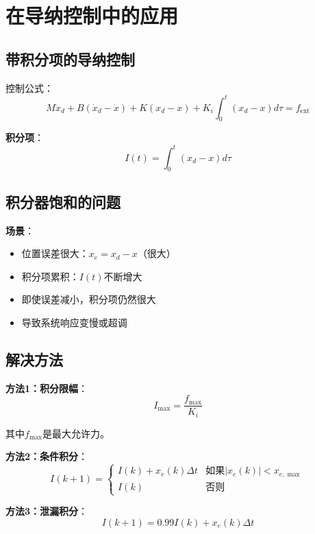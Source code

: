 \documentclass[12pt,a4paper]{article}
\begin{document}
\section{在导纳控制中的应用}

\subsection{带积分项的导纳控制}

控制公式：
\begin{equation}
M\ddot{x}_d + B(\dot{x}_d - \dot{x}) + K(x_d - x) + K_i \int_0^t (x_d - x) d\tau = f_{\text{ext}}
\end{equation}

\textbf{积分项}：
\begin{equation}
I(t) = \int_0^t (x_d - x) d\tau
\end{equation}

\subsection{积分器饱和的问题}

\textbf{场景}：
\begin{itemize}
\item 位置误差很大：$x_e = x_d - x$（很大）
\item 积分项累积：$I(t)$不断增大
\item 即使误差减小，积分项仍然很大
\item 导致系统响应变慢或超调
\end{itemize}

\subsection{解决方法}

\textbf{方法1：积分限幅}：
\begin{equation}
I_{\max} = \frac{f_{\max}}{K_i}
\end{equation}

其中$f_{\max}$是最大允许力。

\textbf{方法2：条件积分}：
\begin{equation}
I(k+1) = \begin{cases}
I(k) + x_e(k) \Delta t & \text{如果} |x_e(k)| < x_{e,\max} \\
I(k) & \text{否则}
\end{cases}
\end{equation}

\textbf{方法3：泄漏积分}：
\begin{equation}
I(k+1) = 0.99 I(k) + x_e(k) \Delta t
\end{equation}
\end{document}
